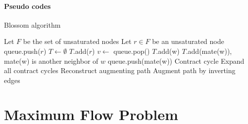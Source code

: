            \paragraph{Pseudo codes}
                \begin{algorithm}
                    \centering
                    \caption{Blossom algorithm}
                    \begin{algorithmic}
                        \State Let $F$ be the set of unsaturated nodes
                            \State Let $r \in F$ be an unsaturated node
                            \State queue.push($r$)
                            \State $T \gets \emptyset$
                            \State $T$.add($r$)
                                \State $v \gets$ queue.pop()
                                        \State $T$.add(w)
                                        \State $T$.add(mate(w)), mate(w) is another neighbor of $w$
                                        \State queue.push(mate(w))
                                        \State Contract cycle
                                        \State Expand all contract cycles
                                        \State Reconstruct augmenting path
                                        \State Augment path by inverting edges
                                    \EndIf
                                \EndFor
                            \EndWhile
                        \EndWhile
                    \end{algorithmic}
                \end{algorithm}    

    \section{Maximum Flow Problem}
